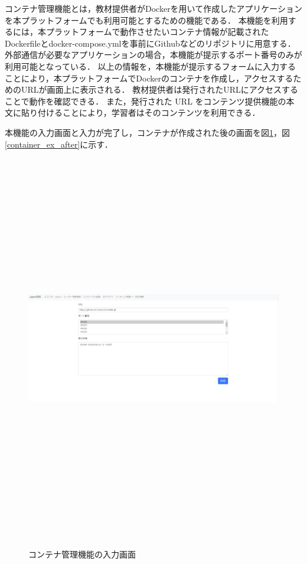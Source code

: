 コンテナ管理機能とは，教材提供者がDockerを用いて作成したアプリケーションを本プラットフォームでも利用可能とするための機能である．
本機能を利用するには，本プラットフォームで動作させたいコンテナ情報が記載されたDockerfileとdocker-compose.ymlを事前にGithubなどのリポジトリに用意する．
外部通信が必要なアプリケーションの場合，本機能が提示するポート番号のみが利用可能となっている．
以上の情報を，本機能が提示するフォームに入力することにより，本プラットフォームでDockerのコンテナを作成し，アクセスするためのURLが画面上に表示される．
教材提供者は発行されたURLにアクセスすることで動作を確認できる．
また，発行された URL をコンテンツ提供機能の本文に貼り付けることにより，学習者はそのコンテンツを利用できる．

本機能の入力画面と入力が完了し，コンテナが作成された後の画面を図\ref{container_ex_before}，図\ref{container_ex_after}に示す．

\begin{figure}[htbp]
    \begin{center}
        \includegraphics[width=18cm,height=17cm,keepaspectratio]{container_before-crop.pdf}\\
    \end{center}
    \caption{コンテナ管理機能の入力画面}
    \label{container_ex_before}
\end{figure}

